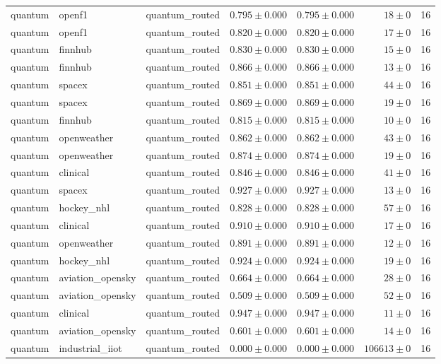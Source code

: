 \begin{table}[htbp]
\begin{tabular}{l l l r r r r}
quantum & openf1 & quantum\_routed & $0.795\pm0.000$ & $0.795\pm0.000$ & $18\pm0$ & 16 \\
quantum & openf1 & quantum\_routed & $0.820\pm0.000$ & $0.820\pm0.000$ & $17\pm0$ & 16 \\
quantum & finnhub & quantum\_routed & $0.830\pm0.000$ & $0.830\pm0.000$ & $15\pm0$ & 16 \\
quantum & finnhub & quantum\_routed & $0.866\pm0.000$ & $0.866\pm0.000$ & $13\pm0$ & 16 \\
quantum & spacex & quantum\_routed & $0.851\pm0.000$ & $0.851\pm0.000$ & $44\pm0$ & 16 \\
quantum & spacex & quantum\_routed & $0.869\pm0.000$ & $0.869\pm0.000$ & $19\pm0$ & 16 \\
quantum & finnhub & quantum\_routed & $0.815\pm0.000$ & $0.815\pm0.000$ & $10\pm0$ & 16 \\
quantum & openweather & quantum\_routed & $0.862\pm0.000$ & $0.862\pm0.000$ & $43\pm0$ & 16 \\
quantum & openweather & quantum\_routed & $0.874\pm0.000$ & $0.874\pm0.000$ & $19\pm0$ & 16 \\
quantum & clinical & quantum\_routed & $0.846\pm0.000$ & $0.846\pm0.000$ & $41\pm0$ & 16 \\
quantum & spacex & quantum\_routed & $0.927\pm0.000$ & $0.927\pm0.000$ & $13\pm0$ & 16 \\
quantum & hockey\_nhl & quantum\_routed & $0.828\pm0.000$ & $0.828\pm0.000$ & $57\pm0$ & 16 \\
quantum & clinical & quantum\_routed & $0.910\pm0.000$ & $0.910\pm0.000$ & $17\pm0$ & 16 \\
quantum & openweather & quantum\_routed & $0.891\pm0.000$ & $0.891\pm0.000$ & $12\pm0$ & 16 \\
quantum & hockey\_nhl & quantum\_routed & $0.924\pm0.000$ & $0.924\pm0.000$ & $19\pm0$ & 16 \\
quantum & aviation\_opensky & quantum\_routed & $0.664\pm0.000$ & $0.664\pm0.000$ & $28\pm0$ & 16 \\
quantum & aviation\_opensky & quantum\_routed & $0.509\pm0.000$ & $0.509\pm0.000$ & $52\pm0$ & 16 \\
quantum & clinical & quantum\_routed & $0.947\pm0.000$ & $0.947\pm0.000$ & $11\pm0$ & 16 \\
quantum & aviation\_opensky & quantum\_routed & $0.601\pm0.000$ & $0.601\pm0.000$ & $14\pm0$ & 16 \\
quantum & industrial\_iiot & quantum\_routed & $0.000\pm0.000$ & $0.000\pm0.000$ & $106613\pm0$ & 16 \\

\end{tabular}
\end{table}
